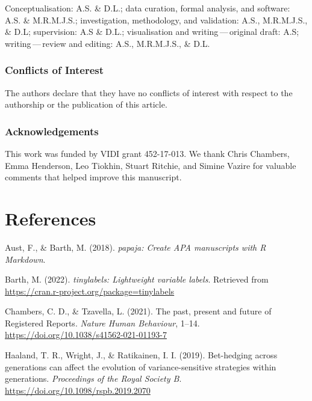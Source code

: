 \documentclass[british,,man,floatsintext]{apa6}
\begin{document}
Conceptualisation: A.S. \& D.L.; data curation, formal analysis, and software: A.S. \& M.R.M.J.S.; investigation, methodology, and validation: A.S., M.R.M.J.S., \& D.L; supervision: A.S \& D.L.; visualisation and writing\(\,\)---\(\,\)original draft: A.S; writing\(\,\)---\(\,\)review and editing: A.S., M.R.M.J.S., \& D.L.

\hypertarget{conflicts-of-interest}{%
\subsubsection{Conflicts of Interest}\label{conflicts-of-interest}}

The authors declare that they have no conflicts of interest with respect to the authorship or the publication of this article.

\hypertarget{acknowledgements}{%
\subsubsection{Acknowledgements}\label{acknowledgements}}

This work was funded by VIDI grant 452-17-013. We thank Chris Chambers, Emma Henderson, Leo Tiokhin, Stuart Ritchie, and Simine Vazire for valuable comments that helped improve this manuscript.

\hypertarget{references}{%
\section{References}\label{references}}

\setlength{\parindent}{-0.2in}
\setlength{\leftskip}{0.2in}

\hypertarget{refs}{}
\leavevmode\hypertarget{ref-R-papaja}{}%
Aust, F., \& Barth, M. (2018). \emph{papaja: Create APA manuscripts with R Markdown}.

\leavevmode\hypertarget{ref-R-tinylabels}{}%
Barth, M. (2022). \emph{tinylabels: Lightweight variable labels}. Retrieved from \url{https://cran.r-project.org/package=tinylabels}

\leavevmode\hypertarget{ref-Chambers2021}{}%
Chambers, C. D., \& Tzavella, L. (2021). The past, present and future of Registered Reports. \emph{Nature Human Behaviour}, 1--14. \url{https://doi.org/10.1038/s41562-021-01193-7}

\leavevmode\hypertarget{ref-Haaland2019}{}%
Haaland, T. R., Wright, J., \& Ratikainen, I. I. (2019). Bet-hedging across generations can affect the evolution of variance-sensitive strategies within generations. \emph{Proceedings of the Royal Society B}. \url{https://doi.org/10.1098/rspb.2019.2070}
\end{document}
